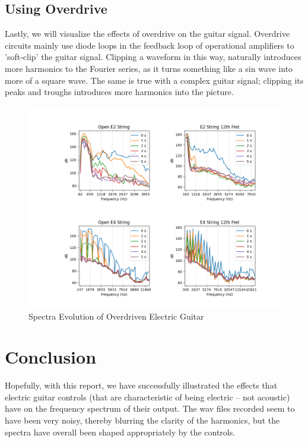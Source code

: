 \documentclass[10pt, a4paper]{article}
\begin{document}
\subsection{Using Overdrive}
Lastly, we will visualize the effects of overdrive on the guitar signal.
Overdrive circuits mainly use diode loops in the feedback loop of operational amplifiers to 'soft-clip' the guitar signal.
Clipping a waveform in this way, naturally introduces more harmonics to the Fourier series, as it turns something like a sin wave into more of a square wave.
The same is true with a complex guitar signal; clipping its peaks and troughs introduces more harmonics into the picture.

\begin{figure}[H]
\centering
\caption{Spectra Evolution of Overdriven Electric Guitar}
\includegraphics[scale=0.5]{odhvt.png}
\end{figure}

\section{Conclusion}

Hopefully, with this report, we have successfully illustrated the effects that electric guitar controls (that are characteristic of being electric -- not acoustic) have on the frequency spectrum of their output.
The wav files recorded seem to have been very noisy, thereby blurring the clarity of the harmonics, but the spectra have overall been shaped appropriately by the controls.
\end{document}
